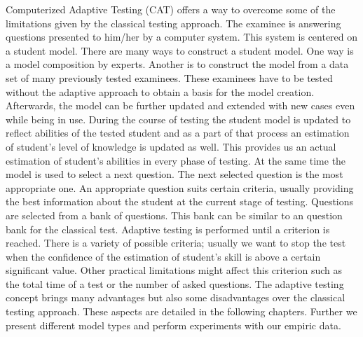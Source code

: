 Computerized Adaptive Testing (CAT) offers a way to overcome some of the limitations given by the classical testing approach. The examinee is answering questions presented to him/her by a computer system. This system is centered on a student model. There are many ways to construct a student model. One way is a model composition by experts. Another is to construct the model from a data set of many previously tested examinees. These examinees have to be tested without the adaptive approach to obtain a basis for the model creation. Afterwards, the model can be further updated and extended with new cases even while being in use. During the course of testing the student model is updated to reflect abilities of the tested student and as a part of that process an estimation of student’s level of knowledge is updated as well. This provides us an actual estimation of student’s abilities in every phase of testing. At the same time the model is used to select a next question. The next selected question is the most appropriate one. An appropriate question suits certain criteria, usually providing the best information about the student at the current stage of testing. Questions are selected from a bank of questions. This bank can be similar to an question bank for the classical test. Adaptive testing is performed until a criterion is reached. There is a variety of possible criteria; usually we want to stop the test when the confidence of the estimation of student’s skill is above a certain significant value. Other practical limitations might affect this criterion such as the total time of a test or the number of asked questions. The adaptive testing concept brings many advantages but also some disadvantages over the classical testing approach. These aspects are detailed in the following chapters. Further we present different model types and perform experiments with our empiric data.
